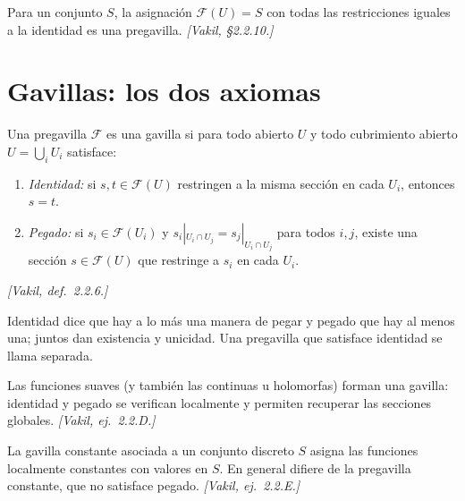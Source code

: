 \begin{ejem}
\label{ejem:s04-pregavilla-constante}
Para un conjunto $S$, la asignación $\mathcal F(U)=S$ con todas las restricciones iguales a la identidad es una pregavilla. \emph{[Vakil, \S2.2.10.]}
\end{ejem}

\section{Gavillas: los dos axiomas}

\begin{defi}[Gavilla]
\label{defi:s04-gavilla}
Una pregavilla $\mathcal F$ es una gavilla si para todo abierto $U$ y todo cubrimiento abierto $U=\bigcup_iU_i$ satisface:
\begin{enumerate}
\item \emph{Identidad:} si $s,t\in\mathcal F(U)$ restringen a la misma sección en cada $U_i$, entonces $s=t$.
\item \emph{Pegado:} si $s_i\in\mathcal F(U_i)$ y $s_i|_{U_i\cap U_j}=s_j|_{U_i\cap U_j}$ para todos $i,j$, existe una sección $s\in\mathcal F(U)$ que restringe a $s_i$ en cada $U_i$.
\end{enumerate}
\emph{[Vakil, def.~2.2.6.]}
\end{defi}

\begin{obs}
\label{obs:s04-identidad-dice-mas-manera-pegar}
Identidad dice que hay a lo más una manera de pegar y pegado que hay al menos una; juntos dan existencia y unicidad. Una pregavilla que satisface identidad se llama separada.
\end{obs}

\begin{ejem}
\label{ejem:s04-funciones-suaves-forman-gavilla}
Las funciones suaves (y también las continuas u holomorfas) forman una gavilla: identidad y pegado se verifican localmente y permiten recuperar las secciones globales. \emph{[Vakil, ej.~2.2.D.]}
\end{ejem}

\begin{ejem}
\label{ejem:s04-gavilla-constante}
La gavilla constante asociada a un conjunto discreto $S$ asigna las funciones localmente constantes con valores en $S$. En general difiere de la pregavilla constante, que no satisface pegado. \emph{[Vakil, ej.~2.2.E.]}
\end{ejem}

